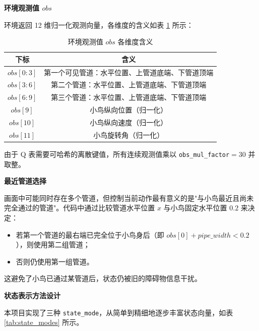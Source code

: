 \documentclass[12pt]{article}
\begin{document}
\textbf{环境观测值 $obs$}

环境返回 12 维归一化观测向量，各维度的含义如表 \ref{tab:obs} 所示：

\begin{table}[H]
	\centering
	\caption{环境观测值 $obs$ 各维度含义}
	\label{tab:obs}
	\begin{tabular}{cc}
		\toprule
		下标 & 含义 \\
		\midrule
		$obs[0:3]$ & 第一个可见管道：水平位置、上管道底端、下管道顶端 \\
		$obs[3:6]$ & 第二个管道：水平位置、上管道底端、下管道顶端 \\
		$obs[6:9]$ & 第三个管道：水平位置、上管道底端、下管道顶端 \\
		$obs[9]$   & 小鸟纵向位置（归一化） \\
		$obs[10]$  & 小鸟纵向速度（归一化） \\
		$obs[11]$  & 小鸟旋转角（归一化） \\
		\bottomrule
	\end{tabular}
\end{table}

由于 Q 表需要可哈希的离散键值，所有连续观测值乘以 \texttt{obs\_mul\_factor}$=30$ 并取整。

\textbf{最近管道选择}

画面中可能同时存在多个管道，但控制当前动作最有意义的是"与小鸟最近且尚未完全通过的管道"。代码中通过比较管道水平位置 $x$ 与小鸟固定水平位置 $0.2$ 来决定：

\begin{itemize}
	\item 若第一个管道的最右端已完全位于小鸟身后（即 $obs[0] + pipe\_width < 0.2$），则使用第二组管道；
	\item 否则仍使用第一组管道。
\end{itemize}

这避免了小鸟已通过某管道后，状态仍被旧的障碍物信息干扰。

\textbf{状态表示方法设计}

本项目实现了三种 \texttt{state\_mode}，从简单到精细地逐步丰富状态向量，如表 \ref{tab:state_modes} 所示。
\end{document}
